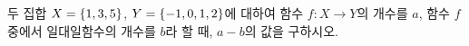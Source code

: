 두 집합 $X=\{1{,}\mkern3mu\mathopen{}3{,}\mkern3mu\mathopen{}5\}$, $Y=\{-1{,}\mkern3mu\mathopen{}0{,}\mkern3mu\mathopen{}1{,}\mkern3mu\mathopen{}2\}$에 대하여 함수 $f:X\longrightarrow Y$의 개수를 $a$, 함수 $f$ 중에서 일대일함수의 개수를 $b$라 할 때, $a-b$의 값을 구하시오.

